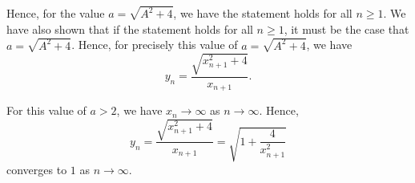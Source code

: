 \begin{enumerate}
          Hence, for the value \(a = \sqrt{A^2 + 4}\), we have the statement holds for all \(n \geq 1\). We have also shown that if the statement holds for all \(n \geq 1\), it must be the case that \(a = \sqrt{A^2 + 4}\). Hence, for precisely this value of \(a = \sqrt{A^2 + 4}\), we have
          \[
              y_n = \frac{\sqrt{x_{n + 1}^2 + 4}}{x_{n + 1}}.
          \]

          For this value of \(a > 2\), we have \(x_n \to \infty\) as \(n \to \infty\). Hence,
          \[
              y_n = \frac{\sqrt{x_{n + 1}^2 + 4}}{x_{n + 1}} = \sqrt{1 + \frac{4}{x_{n + 1}^2}}
          \]
          converges to \(1\) as \(n \to \infty\).
\end{enumerate}